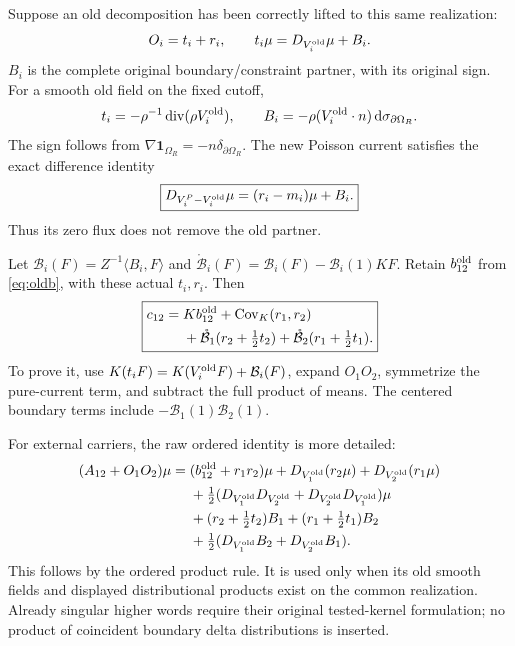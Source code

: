 \documentclass[11pt,letterpaper]{article}
\theoremstyle{plain}
\theoremstyle{remark}\newtheorem{remark}[theorem]{Scope}
\newcommand{\dd}{\,\mathrm d}\newcommand{\OH}{\mathcal O_H}
\newcommand{\ind}{\mathbf1}
\begin{document}
Suppose an old decomposition has been correctly lifted to this same realization:
\begin{equation}
O_i=t_i+r_i,\qquad t_i\mu=D_{V_i^{\rm old}}\mu+B_i.
\label{eq:oldboundarysplit}
\end{equation}
$B_i$ is the complete original boundary/constraint partner, with its original
sign. For a smooth old field on the fixed cutoff,
\begin{equation}
t_i=-\rho^{-1}\diver(\rho V_i^{\rm old}),\qquad
B_i=-\rho(V_i^{\rm old}\cdot n)\dd\sigma_{\partial\Omega_R}.
\label{eq:boundarysign}
\end{equation}
The sign follows from $\nabla\ind_{\Omega_R}=-n\delta_{\partial\Omega_R}$.
The new Poisson current satisfies the exact difference identity
\begin{equation}
\boxed{D_{V_i^P-V_i^{\rm old}}\mu=(r_i-m_i)\mu+B_i.}
\label{eq:changeofsplit}
\end{equation}
Thus its zero flux does not remove the old partner.

Let $\mathcal B_i(F)=Z^{-1}\langle B_i,F\rangle$ and
$\mathring{\mathcal B}_i(F)=\mathcal B_i(F)-\mathcal B_i(1)KF$.
Retain $b_{12}^{\rm old}$ from \eqref{eq:oldb}, with these actual $t_i,r_i$.
Then
\begin{equation}
\boxed{\begin{aligned}
c_{12}={}&Kb_{12}^{\rm old}+\operatorname{Cov}_K(r_1,r_2)\\
&+\mathring{\mathcal B}_1(r_2+\tfrac12t_2)
+\mathring{\mathcal B}_2(r_1+\tfrac12t_1).
\end{aligned}}
\label{eq:boundarybridge}
\end{equation}
To prove it, use
$K(t_iF)=K(V_i^{\rm old}F)+\mathcal B_i(F)$, expand $O_1O_2$, symmetrize
the pure-current term, and subtract the full product of means. The centered
boundary terms include $-\mathcal B_1(1)\mathcal B_2(1)$.

For external carriers, the raw ordered identity is more detailed:
\begin{align}
(A_{12}+O_1O_2)\mu={}&(b_{12}^{\rm old}+r_1r_2)\mu
+D_{V_1^{\rm old}}(r_2\mu)+D_{V_2^{\rm old}}(r_1\mu)\notag\\
&+\tfrac12(D_{V_1^{\rm old}}D_{V_2^{\rm old}}
+D_{V_2^{\rm old}}D_{V_1^{\rm old}})\mu\notag\\
&+(r_2+\tfrac12t_2)B_1+(r_1+\tfrac12t_1)B_2\notag\\
&+\tfrac12(D_{V_1^{\rm old}}B_2+D_{V_2^{\rm old}}B_1).
\label{eq:rawbridge}
\end{align}
This follows by the ordered product rule. It is used only when its old smooth
fields and displayed distributional products exist on the common realization.
Already singular higher words require their original tested-kernel formulation;
no product of coincident boundary delta distributions is inserted.
\end{document}
